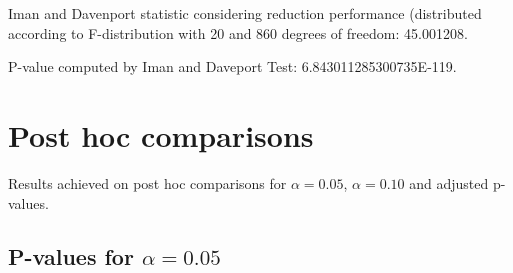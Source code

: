 \documentclass[a4paper,10pt]{article}
\begin{document}
\begin{landscape}
Iman and Davenport statistic considering reduction performance (distributed according to F-distribution with 20 and 860 degrees of freedom: 45.001208.

P-value computed by Iman and Daveport Test: 6.843011285300735E-119.\newline



\pagebreak

\section{Post hoc comparisons}

Results achieved on post hoc comparisons for $\alpha = 0.05$, $\alpha = 0.10$ and adjusted p-values.

\subsection{P-values for $\alpha=0.05$}


\end{landscape}
\end{document}
